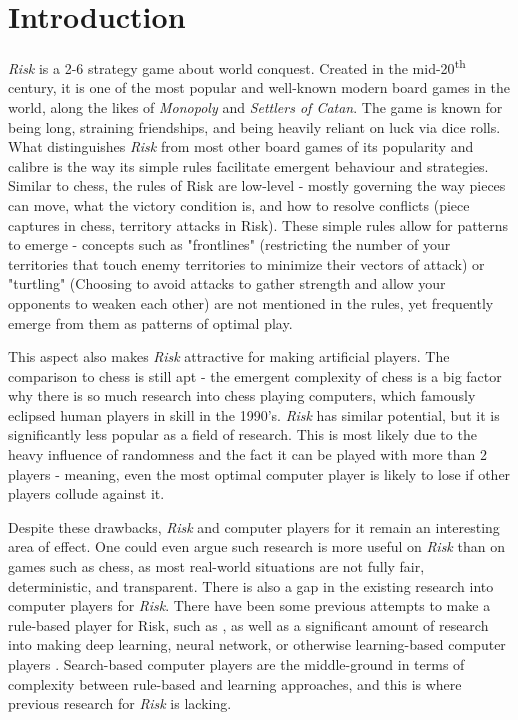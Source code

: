 \graphicspath{ {./Images/} }
\chapter{Introduction}
\label{introduction}

\textit{Risk} is a 2-6 strategy game about world conquest. Created in the mid-20\textsuperscript{th} century, it is one of the most popular and well-known modern board games in the world, along the likes of \textit{Monopoly} and \textit{Settlers of Catan}. The game is known for being long, straining friendships, and being heavily reliant on luck via dice rolls. What distinguishes \textit{Risk} from most other board games of its popularity and calibre is the way its simple rules facilitate emergent behaviour and strategies. Similar to chess, the rules of Risk are low-level - mostly governing the way pieces can move, what the victory condition is, and how to resolve conflicts (piece captures in chess, territory attacks in Risk). These simple rules allow for patterns to emerge - concepts such as "frontlines" (restricting the number of your territories that touch enemy territories to minimize their vectors of attack) or "turtling" (Choosing to avoid attacks to gather strength and allow your opponents to weaken each other) are not mentioned in the rules, yet frequently emerge from them as patterns of optimal play.

This aspect also makes \textit{Risk} attractive for making artificial players. The comparison to chess is still apt - the emergent complexity of chess is a big factor why there is so much research into chess playing computers, which famously eclipsed human players in skill in the 1990's. \textit{Risk} has similar potential, but it is significantly less popular as a field of research. This is most likely due to the heavy influence of randomness and the fact it can be played with more than 2 players - meaning, even the most optimal computer player is likely to lose if other players collude against it.

Despite these drawbacks, \textit{Risk} and computer players for it remain an interesting area of effect. One could even argue such research is more useful on \textit{Risk} than on games such as chess, as most real-world situations are not fully fair, deterministic, and transparent. There is also a gap in the existing research into computer players for \textit{Risk}. There have been some previous attempts to make a rule-based player for Risk, such as \cite{wolf2005intelligent}, as well as a significant amount of research into making deep learning, neural network, or otherwise learning-based computer players \cite{bauer2023artificial,blomqvist2020playing,olsson2005multi}. Search-based computer players are the middle-ground in terms of complexity between rule-based and learning approaches, and this is where previous research for \textit{Risk} is lacking.

